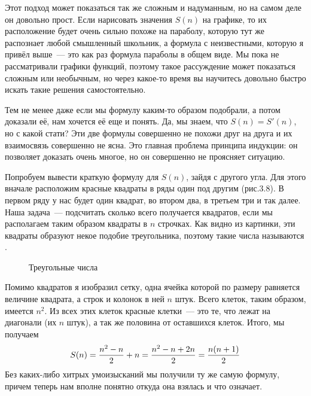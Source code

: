 Этот подход может показаться так же сложным и надуманным, но на самом деле он довольно прост. Если нарисовать значения $S(n)$ на графике, то их расположение будет очень сильно похоже на параболу, которую тут же распознает любой смышленный школьник, а формула с неизвестными, которую я привёл выше~--- это как раз формула параболы в общем виде. Мы пока не рассматривали графики функций, поэтому такое рассуждение может показаться сложным или необычным, но через какое-то время вы научитесь довольно быстро искать такие решения самостоятельно.

Тем не менее даже если мы формулу каким-то образом подобрали, а потом доказали её, нам хочется её еще и понять. Да, мы знаем, что $S(n)=S'(n)$, но с какой стати? Эти две формулы совершенно не похожи друг на друга и их взаимосвязь совершенно не ясна. Это главная проблема принципа индукции: он позволяет доказать очень многое, но он совершенно не проясняет ситуацию.

Попробуем вывести краткую формулу для $S(n)$, зайдя с другого угла. Для этого вначале расположим красные квадраты в ряды один под другим (рис.3.8). В первом ряду у нас будет один квадрат, во втором два, в третьем три и так далее. Наша задача~--- подсчитать сколько всего получается квадратов, если мы располагаем таким образом квадраты в $n$ строчках. Как видно из картинки, эти квадраты образуют некое подобие треугольника, поэтому такие числа называются .

\begin{figure}[h]
\centering
{}
\caption{Треугольные числа}
\end{figure}

Помимо квадратов я изобразил сетку, одна ячейка которой по размеру равняется величине квадрата, а строк и колонок в ней $n$ штук. Всего клеток, таким образом, имеется $n^2$. Из всех этих клеток красные клетки~--- это те, что лежат на диагонали (их $n$ штук), а так же половина от оставшихся клеток. Итого, мы получаем
$$S(n) = {n^2 - n\over 2} + n = {n^2 - n + 2n \over 2} = {n(n+1)\over 2}$$
Без каких-либо хитрых умоизысканий мы получили ту же самую формулу, причем теперь нам вполне понятно откуда она взялась и что означает.

